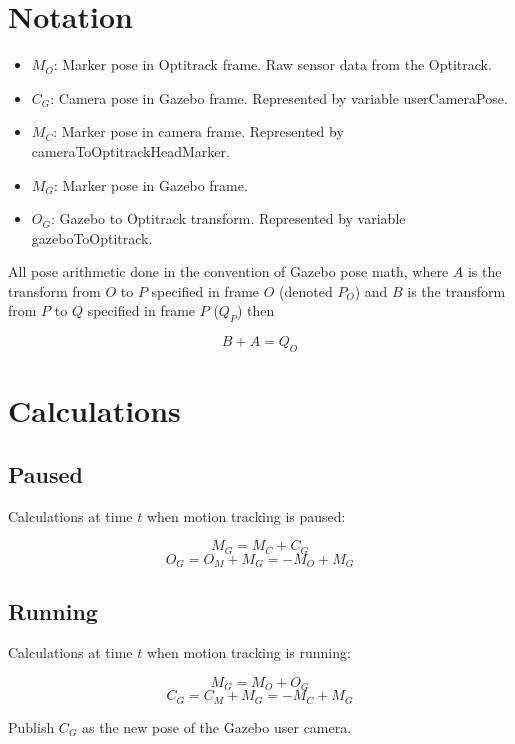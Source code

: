 \documentclass[11pt, letterpaper]{article}
\begin{document}
\section{Notation}
\begin{itemize}
\item $M_O$: Marker pose in Optitrack frame. Raw sensor data from the Optitrack.

\item $C_G$: Camera pose in Gazebo frame. Represented by variable userCameraPose.

\item $M_C$: Marker pose in camera frame. Represented by cameraToOptitrackHeadMarker.

\item $M_G$: Marker pose in Gazebo frame.

\item $O_G$: Gazebo to Optitrack transform. Represented by variable gazeboToOptitrack.
\end{itemize}

All pose arithmetic done in the convention of Gazebo pose math, where $A$ is
the transform from $O$ to $P$ specified in frame $O$ (denoted $P_O$) and $B$
is the transform from $P$ to $Q$ specified in frame $P$ ($Q_P$) then

\begin{equation}
B + A = Q_O
\end{equation}

\section{Calculations}
\subsection{Paused}
Calculations at time $t$ when motion tracking is paused:

\begin{equation}
M_G = M_C + C_G
\end{equation}
\begin{equation}
O_G = O_M + M_G = -M_O + M_G
\end{equation}

\subsection{Running}
Calculations at time $t$ when motion tracking is running:

\begin{equation}
M_G = M_O + O_G
\end{equation}
\begin{equation}
C_G = C_M + M_G = -M_C + M_G
\end{equation}

Publish $C_G$ as the new pose of the Gazebo user camera.
\end{document}

